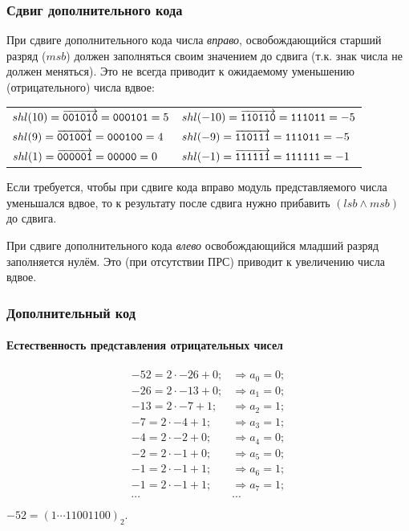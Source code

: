 \begin{frame}
    \frametitle{Сдвиг дополнительного кода}
    
    При сдвиге дополнительного кода числа \emph{вправо}, освобождающийся старший разряд ($msb$) должен заполняться своим значением до сдвига (т.к. знак числа не должен меняться). Это не всегда приводит к ожидаемому уменьшению (отрицательного) числа вдвое:
    \begin{tabular}{l|l}
        $shl(10)=\overrightarrow{\texttt{001010}}=\texttt{000101}=5$
            & $shl(-10)=\overrightarrow{\texttt{110110}}=\texttt{111011}=-5$ \\
        $shl(9)=\overrightarrow{\texttt{001001}}=\texttt{000100}=4$
            & $shl(-9)=\overrightarrow{\texttt{110111}}=\texttt{111011}=-5$ \\
        $shl(1)=\overrightarrow{\texttt{000001}}=\texttt{00000}=0$
            & $shl(-1)=\overrightarrow{\texttt{111111}}=\texttt{111111}=-1$ \\
    \end{tabular}
    Если требуется, чтобы при сдвиге кода вправо модуль представляемого числа уменьшался вдвое, то к результату после сдвига нужно прибавить $(lsb\land msb)$ до сдвига.
    
    При сдвиге дополнительного кода \emph{влево} освобождающийся младший разряд заполняется нулём. Это (при отсутствии ПРС) приводит к увеличению числа вдвое.
\end{frame}

\begin{frame}
    \frametitle{Дополнительный код}
    \framesubtitle{Естественность представления отрицательных чисел}
    
    \[
        \begin{array}{ll}
            {-52} = 2\cdot {-26} + 0; & \Rightarrow a_0 = 0; \\
            {-26} = 2\cdot {-13} + 0; & \Rightarrow a_1 = 0; \\
            {-13} = 2\cdot {-7} + 1;  & \Rightarrow a_2 = 1; \\
            {-7}  = 2\cdot {-4} + 1;  & \Rightarrow a_3 = 1; \\
            {-4}  = 2\cdot {-2} + 0;  & \Rightarrow a_4 = 0; \\
            {-2}  = 2\cdot {-1} + 0;  & \Rightarrow a_5 = 0; \\
            {-1}  = 2\cdot {-1} + 1;  & \Rightarrow a_6 = 1; \\
            {-1}  = 2\cdot {-1} + 1;  & \Rightarrow a_7 = 1; \\
            \cdots                    & \cdots \\
        \end{array}
    \]
    $-52=(1\cdots 11001100)_2.$
\end{frame}


